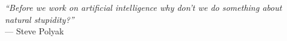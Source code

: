 \begin{epigraph}

\vspace*{-0.25in}
\begin{center}
\vspace*{\fill}



\textit{``Before we work on artificial intelligence why don’t we do something about natural stupidity?''}
\\
--- Steve Polyak
\vspace*{\fill}
\end{center}

\end{epigraph}
